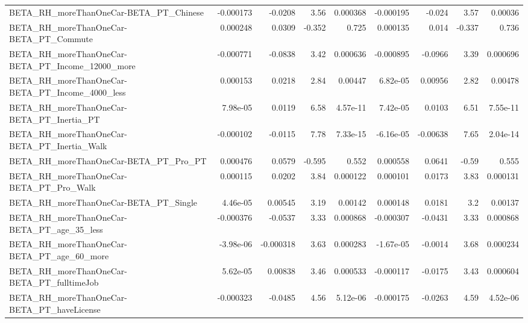 \begin{tabular}{lrrrrrrrr}
BETA\_RH\_moreThanOneCar-BETA\_PT\_Chinese             &   -0.000173 &      -0.0208 &     3.56 & 0.000368 &  -0.000195 &      -0.024 &         3.57 &       0.00036 \\
BETA\_RH\_moreThanOneCar-BETA\_PT\_Commute             &    0.000248 &       0.0309 &   -0.352 &    0.725 &   0.000135 &       0.014 &       -0.337 &         0.736 \\
BETA\_RH\_moreThanOneCar-BETA\_PT\_Income\_12000\_more   &   -0.000771 &      -0.0838 &     3.42 & 0.000636 &  -0.000895 &     -0.0966 &         3.39 &      0.000696 \\
BETA\_RH\_moreThanOneCar-BETA\_PT\_Income\_4000\_less    &    0.000153 &       0.0218 &     2.84 &  0.00447 &   6.82e-05 &     0.00956 &         2.82 &       0.00478 \\
BETA\_RH\_moreThanOneCar-BETA\_PT\_Inertia\_PT          &    7.98e-05 &       0.0119 &     6.58 & 4.57e-11 &   7.42e-05 &      0.0103 &         6.51 &      7.55e-11 \\
BETA\_RH\_moreThanOneCar-BETA\_PT\_Inertia\_Walk        &   -0.000102 &      -0.0115 &     7.78 & 7.33e-15 &  -6.16e-05 &    -0.00638 &         7.65 &      2.04e-14 \\
BETA\_RH\_moreThanOneCar-BETA\_PT\_Pro\_PT              &    0.000476 &       0.0579 &   -0.595 &    0.552 &   0.000558 &      0.0641 &        -0.59 &         0.555 \\
BETA\_RH\_moreThanOneCar-BETA\_PT\_Pro\_Walk            &    0.000115 &       0.0202 &     3.84 & 0.000122 &   0.000101 &      0.0173 &         3.83 &      0.000131 \\
BETA\_RH\_moreThanOneCar-BETA\_PT\_Single              &    4.46e-05 &      0.00545 &     3.19 &  0.00142 &   0.000148 &      0.0181 &          3.2 &       0.00137 \\
BETA\_RH\_moreThanOneCar-BETA\_PT\_age\_35\_less         &   -0.000376 &      -0.0537 &     3.33 & 0.000868 &  -0.000307 &     -0.0431 &         3.33 &      0.000868 \\
BETA\_RH\_moreThanOneCar-BETA\_PT\_age\_60\_more         &   -3.98e-06 &    -0.000318 &     3.63 & 0.000283 &  -1.67e-05 &     -0.0014 &         3.68 &      0.000234 \\
BETA\_RH\_moreThanOneCar-BETA\_PT\_fulltimeJob         &    5.62e-05 &      0.00838 &     3.46 & 0.000533 &  -0.000117 &     -0.0175 &         3.43 &      0.000604 \\
BETA\_RH\_moreThanOneCar-BETA\_PT\_haveLicense         &   -0.000323 &      -0.0485 &     4.56 & 5.12e-06 &  -0.000175 &     -0.0263 &         4.59 &      4.52e-06 \\

\end{tabular}

